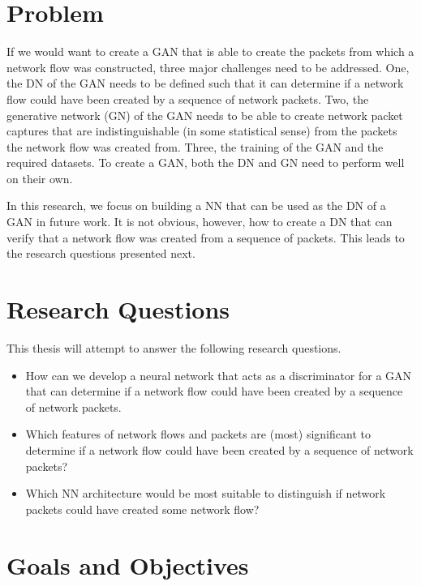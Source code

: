 \documentclass[
	ngerman,
	ruledheaders=section,%
	class=report,%
	thesis={type=bachelor},%
	accentcolor=9c,%
	custommargins=true,%
	marginpar=false,%
	parskip=half-,%
	fontsize=11pt,%
	twoside
]{tudapub}
\begin{document}
\section{Problem}
\label{sec:problem}

If we would want to create a GAN that is able to create the packets from which a network flow was constructed,
three major challenges need to be addressed.
One, the DN of the GAN needs to be defined such that it can determine if a network flow could have been created by a sequence of network packets.
Two, the generative network (GN) of the GAN needs to be able to create network packet captures that are indistinguishable (in some statistical sense) from the packets the network flow was created from.
Three, the training of the GAN and the required datasets.
To create a GAN, both the DN and GN need to perform well on their own.

In this research, we focus on building a NN that can be used as the DN of a GAN in future work.
It is not obvious, however, how to create a DN that
can verify that a network flow was created from a sequence of packets.
This leads to the research questions presented next.

\section{Research Questions}
\label{sec:researchQuestions}

This thesis will attempt to answer the following research questions.

\begin{itemize}
  \item How can we develop a neural network that acts as a discriminator for a GAN
  that can determine if a network flow could have been created by a sequence of network packets.
  \item Which features of network flows and packets are (most) significant to determine if a network flow could have been created by a sequence of network packets?
  \item Which NN architecture would be most suitable to distinguish if network packets could have created some network flow?
\end{itemize}

\section{Goals and Objectives}
\label{sec:goals}

\end{document}

